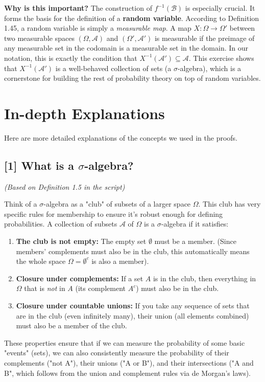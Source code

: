 \documentclass[11pt,a4paper]{article}
\begin{document}
\textbf{Why is this important?} The construction of \(f^{-1}(\mathcal{B})\) is especially crucial. It forms the basis for the definition of a \textbf{random variable}. According to Definition 1.45, a random variable is simply a \textit{measurable map}. A map \(X: \Omega \to \Omega'\) between two measurable spaces \((\Omega, \mathcal{A})\) and \((\Omega', \mathcal{A'})\) is measurable if the preimage of any measurable set in the codomain is a measurable set in the domain. In our notation, this is exactly the condition that \(X^{-1}(\mathcal{A'}) \subseteq \mathcal{A}\). This exercise shows that \(X^{-1}(\mathcal{A'})\) is a well-behaved collection of sets (a \(\sigma\)-algebra), which is a cornerstone for building the rest of probability theory on top of random variables.

\newpage
\appendix
\section{In-depth Explanations}

Here are more detailed explanations of the concepts we used in the proofs.

\subsection*{\hypertarget{def:sigma-algebra}{\textbf{[1] What is a \(\sigma\)-algebra?}}}
\emph{(Based on Definition 1.5 in the script)}

Think of a \(\sigma\)-algebra as a "club" of subsets of a larger space \(\Omega\). This club has very specific rules for membership to ensure it's robust enough for defining probabilities.
A collection of subsets \(\mathcal{A}\) of \(\Omega\) is a \(\sigma\)-algebra if it satisfies:
\begin{enumerate}
    \item \textbf{The club is not empty:} The empty set \(\emptyset\) must be a member. (Since members' complements must also be in the club, this automatically means the whole space \(\Omega = \emptyset^c\) is also a member).
    \item \textbf{Closure under complements:} If a set \(A\) is in the club, then everything in \(\Omega\) that is \textit{not} in \(A\) (its complement \(A^c\)) must also be in the club.
    \item \textbf{Closure under countable unions:} If you take any sequence of sets that are in the club (even infinitely many), their union (all elements combined) must also be a member of the club.
\end{enumerate}
These properties ensure that if we can measure the probability of some basic "events" (sets), we can also consistently measure the probability of their complements ("not A"), their unions ("A or B"), and their intersections ("A and B", which follows from the union and complement rules via de Morgan's laws).
\end{document}
